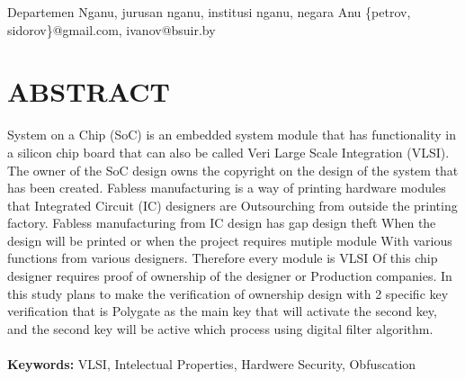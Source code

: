 \documentclass[laterpaper,10pt,twoside]{article}
\begin{document}
\setcounter{section}{0}
\setcounter{figure}{0}
\setcounter{table}{0}
\setcounter{equation}{0}
\setcounter{secnumdepth}{1}
\setcounter{secnumdepth}{1}


{Departemen Nganu, jurusan nganu, institusi nganu, negara Anu} 
{\{petrov, sidorov\}@gmail.com, ivanov@bsuir.by}

\section*{ABSTRACT}
\noindent System on a Chip (SoC) is an embedded system module that has functionality in a silicon chip board that can also be called Veri Large Scale Integration (VLSI). The owner of the SoC design owns the copyright on the design of the system that has been created. Fabless manufacturing is a way of printing hardware modules that Integrated Circuit (IC) designers are Outsourching from outside the printing factory. Fabless manufacturing from IC design has gap design theft When the design will be printed or when the project requires mutiple module With various functions from various designers. Therefore every module is VLSI Of this chip designer requires proof of ownership of the designer or Production companies. In this study plans to make the verification of ownership design with 2 specific key verification that is Polygate as the main key that will activate the second key, and the second key will be active which process using digital filter algorithm.\\\\
\noindent \textbf{Keywords:} VLSI, Intelectual Properties, Hardwere Security, Obfuscation
\end{document}
